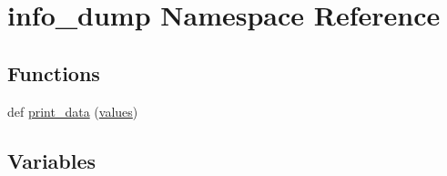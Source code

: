 \hypertarget{namespaceinfo__dump}{}\section{info\+\_\+dump Namespace Reference}
\label{namespaceinfo__dump}
\subsection*{Functions}
\begin{DoxyCompactItemize}
\item 
def \hyperlink{namespaceinfo__dump_ac13e616852fd9e21cf91c62bd7c6ba7c}{print\+\_\+data} (\hyperlink{namespaceinfo__dump_a519d64383e606d3ddaff0c01f233d087}{values})
\end{DoxyCompactItemize}
\subsection*{Variables}
